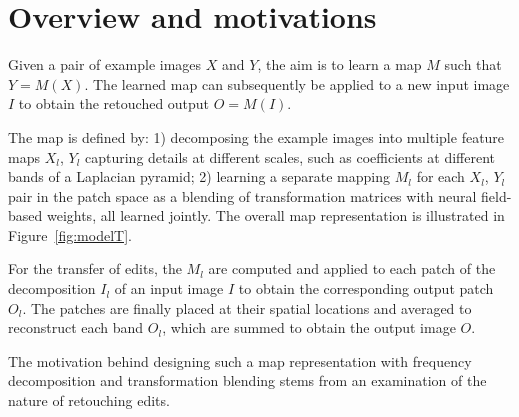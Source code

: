 \section{Overview and motivations}
\label{chap:motivations}

Given a pair of example images $X$ and $Y$, the aim is to learn a map $M$ such that $Y = M(X)$. The learned map can subsequently be applied to a new input image $I$ to obtain the retouched output $O = M(I)$.

The map is defined by: 1) decomposing the example images into multiple feature maps $X_l$, $Y_l$ capturing details at different scales, such as coefficients at different bands of a Laplacian pyramid; 2) learning a separate mapping $M_l$ for each $X_l$, $Y_l$ pair in the patch space as a blending of transformation matrices with neural field-based weights, all learned jointly. The overall map representation is illustrated in Figure~\ref{fig:modelT}.

For the transfer of edits, the $M_l$ are computed and applied to each patch of the decomposition $I_l$ of an input image $I$ to obtain the corresponding output patch $O_l$. The patches are finally placed at their spatial locations and averaged to reconstruct each band $O_l$, which are summed to obtain the output image $O$. 

The motivation behind designing such a map representation with frequency decomposition and transformation blending stems from an examination of the nature of retouching edits.

